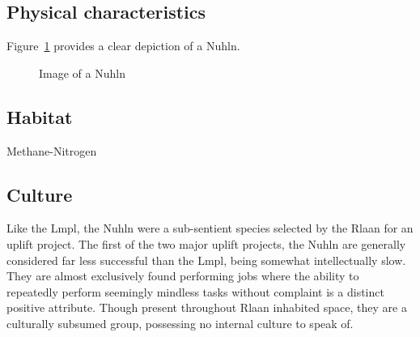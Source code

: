 \subsection{Physical characteristics}
Figure~\ref{fig:Nuhln} provides a clear depiction of a Nuhln.

\begin{figure}
\begin{center}
    \caption{Image of a Nuhln}
    \label{fig:Nuhln}
\end{center}
\end{figure}

 
\subsection{Habitat}
Methane-Nitrogen 

\subsection{Culture}
Like the Lmpl, the Nuhln were a sub-sentient species selected by the
Rlaan for an uplift project. The first of the two major uplift
projects, the Nuhln are generally considered far less successful than
the Lmpl, being somewhat intellectually slow. They are almost
exclusively found performing jobs where the ability to repeatedly
perform seemingly mindless tasks without complaint is a distinct
positive attribute. Though present throughout Rlaan inhabited space,
they are a culturally subsumed group, possessing no internal culture
to speak of.


